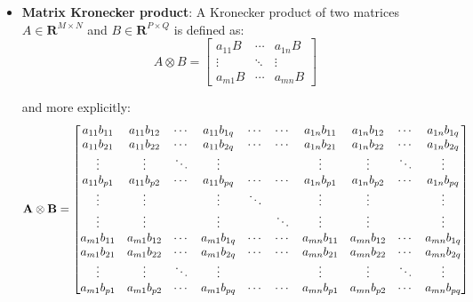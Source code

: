 \begin{itemize}
        
    \item \textbf{Matrix Kronecker product}: 
       A Kronecker product of two matrices $A \in \mathbf{R}^{M \times N}$ and $B \in \mathbf{R}^{P \times Q}$
       is defined as: 
        \begin{equation} 
        A\otimes B = \begin{bmatrix} a_{11} B & \cdots & a_{1n}B \\ \vdots & \ddots & \vdots \\ a_{m1} B & \cdots & a_{mn} B \end{bmatrix}
        \end{equation}
        
        and more explicitly: 
\begin{align*}
\centering
   \mathbf{A}\otimes\mathbf{B} = \begin{bmatrix}
   a_{11} b_{11} & a_{11} b_{12} & \cdots & a_{11} b_{1q} &
                   \cdots & \cdots & a_{1n} b_{11} & a_{1n} b_{12} & \cdots & a_{1n} b_{1q} \\
   a_{11} b_{21} & a_{11} b_{22} & \cdots & a_{11} b_{2q} &
                   \cdots & \cdots & a_{1n} b_{21} & a_{1n} b_{22} & \cdots & a_{1n} b_{2q} \\
   \vdots & \vdots & \ddots & \vdots & & & \vdots & \vdots & \ddots & \vdots \\
   a_{11} b_{p1} & a_{11} b_{p2} & \cdots & a_{11} b_{pq} &
                   \cdots & \cdots & a_{1n} b_{p1} & a_{1n} b_{p2} & \cdots & a_{1n} b_{pq} \\
   \vdots & \vdots & & \vdots & \ddots & & \vdots & \vdots & & \vdots \\
   \vdots & \vdots & & \vdots & & \ddots & \vdots & \vdots & & \vdots \\
   a_{m1} b_{11} & a_{m1} b_{12} & \cdots & a_{m1} b_{1q} &
                   \cdots & \cdots & a_{mn} b_{11} & a_{mn} b_{12} & \cdots & a_{mn} b_{1q} \\
   a_{m1} b_{21} & a_{m1} b_{22} & \cdots & a_{m1} b_{2q} &
                   \cdots & \cdots & a_{mn} b_{21} & a_{mn} b_{22} & \cdots & a_{mn} b_{2q} \\
   \vdots & \vdots & \ddots & \vdots & & & \vdots & \vdots & \ddots & \vdots \\
   a_{m1} b_{p1} & a_{m1} b_{p2} & \cdots & a_{m1} b_{pq} &
                   \cdots & \cdots & a_{mn} b_{p1} & a_{mn} b_{p2} & \cdots & a_{mn} b_{pq}
\end{bmatrix} 
\end{align*}
        

\end{itemize}
